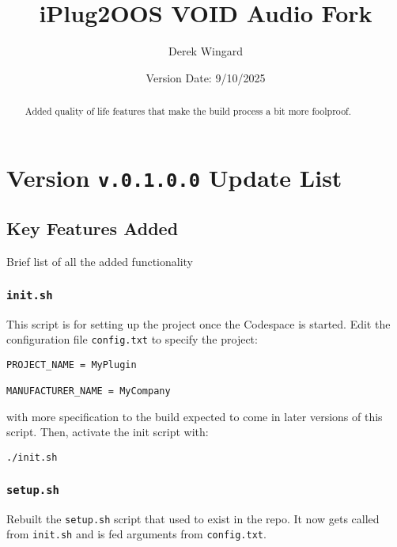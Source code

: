 \documentclass[twocolumn,natbib]{svjour3}        %
\begin{document}
\title{iPlug2OOS VOID Audio Fork}

\author{Derek Wingard}


\date{Version Date: 9/10/2025}

\maketitle

\begin{abstract}
    Added quality of life features that make the build process a bit more foolproof.
\end{abstract}

\section{Version \texttt{v.0.1.0.0} Update List}
\subsection{Key Features Added}
Brief list of all the added functionality

\subsubsection{\texttt{init.sh}}
This script is for setting up the project once the Codespace is started. Edit the configuration file \texttt{config.txt} to specify the project:
\begin{verbatim}
PROJECT_NAME = MyPlugin

MANUFACTURER_NAME = MyCompany
\end{verbatim}
with more specification to the build expected to come in later versions of this script.
Then, activate the init script with:
\begin{lstlisting}
./init.sh
\end{lstlisting}

\subsubsection{\texttt{setup.sh}} 
Rebuilt the \texttt{setup.sh} script that used to exist in the repo. It now gets called from \texttt{init.sh} and is fed arguments from \texttt{config.txt}.
\end{document}
